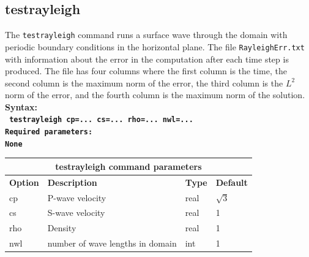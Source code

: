 \documentclass[11pt]{report}
\begin{document}
{\subsection{testrayleigh}
\begin{flushleft}
	The {\tt testrayleigh} command runs a surface wave through the domain with periodic boundary conditions
	in the horizontal plane. The file \verb+RayleighErr.txt+ with information about the error in the computation
	after each time step is produced. The file has four columns where the first column is the time, the
	second column is the maximum norm of the error, the third column is the $L^2$ norm of the error, and the
	fourth column is the maximum norm of the solution.
	\\
	\bf
	Syntax:\\
	\tt
	testrayleigh cp=... cs=... rho=... nwl=...
	\\
	\bf
	Required parameters:\\
	\rm
	None
\end{flushleft}
\begin{center}
	\begin{tabular}{|l|p{8cm}|l|l|} \hline
		\multicolumn{4}{|c|}{\bf testrayleigh command parameters}                 \\ \hline
		\bf{Option} & \bf{Description}                 & \bf{Type} & \bf{Default} \\ \hline \hline
		cp          & P-wave velocity                  & real      & $\sqrt{3}$   \\ \hline
		cs          & S-wave velocity                  & real      & 1            \\ \hline
		rho         & Density                          & real      & 1            \\ \hline
		nwl         & number of wave lengths in domain & int       & 1            \\ \hline
	\end{tabular}
\end{center}

}
\end{document}
